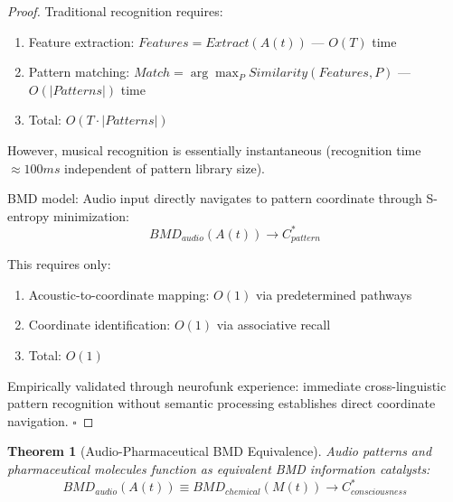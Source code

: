 \documentclass[12pt]{article}
\newtheorem{theorem}{Theorem}[section]
\theoremstyle{definition}
\theoremstyle{remark}
\begin{document}
\begin{proof}
Traditional recognition requires:
\begin{enumerate}
\item Feature extraction: $Features = Extract(A(t))$ — $O(T)$ time
\item Pattern matching: $Match = \arg\max_P Similarity(Features, P)$ — $O(|Patterns|)$ time
\item Total: $O(T \cdot |Patterns|)$
\end{enumerate}

However, musical recognition is essentially instantaneous (recognition time $\approx 100ms$ independent of pattern library size).

BMD model: Audio input directly navigates to pattern coordinate through S-entropy minimization:
\begin{equation}
BMD_{audio}(A(t)) \rightarrow C_{pattern}^*
\end{equation}

This requires only:
\begin{enumerate}
\item Acoustic-to-coordinate mapping: $O(1)$ via predetermined pathways
\item Coordinate identification: $O(1)$ via associative recall
\item Total: $O(1)$
\end{enumerate}

Empirically validated through neurofunk experience: immediate cross-linguistic pattern recognition without semantic processing establishes direct coordinate navigation. $\square$
\end{proof}

\begin{theorem}[Audio-Pharmaceutical BMD Equivalence]
\label{thm:audio_pharma_equivalence}
Audio patterns and pharmaceutical molecules function as equivalent BMD information catalysts:
\begin{equation}
BMD_{audio}(A(t)) \equiv BMD_{chemical}(M(t)) \rightarrow C^*_{consciousness}
\end{equation}
\end{theorem}
\end{document}
